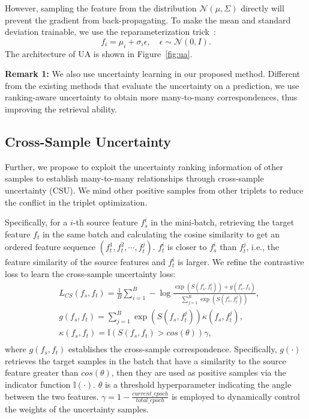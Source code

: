 \documentclass[letterpaper]{article} \usepackage{aaai24}  \usepackage{times}  \usepackage{helvet}  \usepackage{courier}  \usepackage[hyphens]{url}  \usepackage{graphicx} \urlstyle{rm} \def\UrlFont{\rm}  \usepackage{natbib}  \usepackage{caption} \frenchspacing  \setlength{\pdfpagewidth}{8.5in} \setlength{\pdfpageheight}{11in} \usepackage{amsmath,amsfonts}
\begin{document}
However, sampling the feature from the distribution $\mathcal{N}\left( \mu, \Sigma \right)$ directly will prevent the gradient from back-propagating. To make the mean and standard deviation trainable, we use the reparameterization trick~\cite{kingma2014vae}:
\begin{equation}
    f_i=\mu_i+\sigma_i\epsilon,\quad\epsilon\sim\mathcal{N}(0,I).
\end{equation}
The architecture of UA is shown in Figure~\ref{fig:ua}.

\textbf{Remark 1:} We also use uncertainty learning in our proposed method. Different from the existing methods that evaluate the  uncertainty on a prediction, we use ranking-aware uncertainty to obtain more many-to-many correspondences, thus improving the retrieval ability. 

\subsection{Cross-Sample Uncertainty}
Further, we propose to exploit the uncertainty ranking information of other samples to establish many-to-many relationships through cross-sample uncertainty (CSU). We mind other positive samples from other triplets to reduce the conflict in the triplet optimization. 

Specifically, for a $i$-th source feature $f_s^i$ in the mini-batch, retrieving the target feature $f_t$ in the same batch and calculating the cosine similarity to get an ordered feature sequence $(f_t^1,f_t^2,\cdots,f_t^j)$. $f_t^i$ is closer to $f_s^i$ than $f_t^j$, i.e., the feature similarity of the source features and $f_t^i$ is larger.
We refine the contrastive loss to learn the cross-sample uncertainty loss:
\begin{equation}
    \begin{aligned}
        &{L}_{CS}(f_ s , f_ t) = \frac1B\sum_{i=1}^B-\log
        \frac{\exp\left(S\left(f_s^i,f_t^i\right)\right) + g(f_s^i, f_t)}
        {\sum_{j=1}^B\exp\left(S\left(f_s^i,f_t^j\right)\right)},\\
        &g(f_s, f_t) = \sum_{j=1}^B\exp\left(S\left(f_s,f_t^j\right)\right)\kappa\left(f_s,f_t^j\right),\\
        &\kappa\left(f_s,f_t\right) = \mathbb{I}\left(S\left(f_s,f_t\right) > cos(\theta)\right) \gamma, \\
    \end{aligned}
    \label{eq:L_CS}
\end{equation}
where $g(f_s, f_t)$ establishes the cross-sample correspondence. Specifically, $g(\cdot)$ retrieves the target samples in the batch that have a similarity to the source feature greater than $cos(\theta)$, then they are used as positive samples via the indicator function $\mathbb{I}(\cdot)$. $\theta$ is a threshold hyperparameter indicating the angle between the two features. $\gamma = 1 - \frac{current\_epoch}{total\_epoch}$ is employed to dynamically control the weights of the uncertainty samples.
\end{document}
